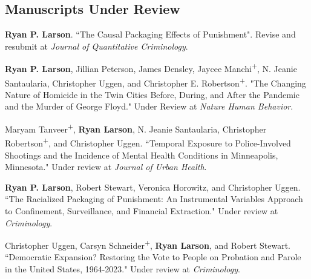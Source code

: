 \documentclass[letterpaper]{article}
\newenvironment{publist}{%
  \begin{list}{}{%
    \setlength{\leftmargin}{0cm}   %
    \setlength{\labelwidth}{2cm}     %
    \setlength{\labelsep}{0.5cm}     %
  }%
}{%
  \end{list}%
}
\begin{document}
\subsection*{Manuscripts Under Review}
\begin{publist}

\item \textbf{Ryan P. Larson}. ``The Causal Packaging Effects of Punishment". Revise and resubmit at \textit{Journal of Quantitative Criminology}.

\item \textbf{Ryan P. Larson}, Jillian Peterson, James Densley, Jaycee Manchi\textsuperscript{+}, N. Jeanie Santaularia, Christopher Uggen, and Christopher E. Robertson\textsuperscript{+}. "The Changing Nature of Homicide in the Twin Cities Before, During, and After the Pandemic and the Murder of George Floyd." Under Review at \textit{Nature Human Behavior}. 

\item Maryam Tanveer\textsuperscript{+}, \textbf{Ryan Larson}, N. Jeanie Santaularia, Christopher Robertson\textsuperscript{+}, and Christopher Uggen. ``Temporal Exposure to Police-Involved Shootings and the Incidence of Mental Health Conditions in Minneapolis, Minnesota." Under review at \textit{Journal of Urban Health}. 

\item \textbf{Ryan P. Larson}, Robert Stewart, Veronica Horowitz, and Christopher Uggen. ``The Racialized Packaging of Punishment: An Instrumental Variables Approach to Confinement, Surveillance, and Financial Extraction." Under review at \textit{Criminology}.

\item Christopher Uggen, Carsyn Schneider\textsuperscript{+}, \textbf{Ryan Larson}, and Robert Stewart. ``Democratic Expansion? Restoring the Vote to People on Probation and Parole in the United States, 1964-2023." Under review at \textit{Criminology}.

\end{publist}
\end{document}
